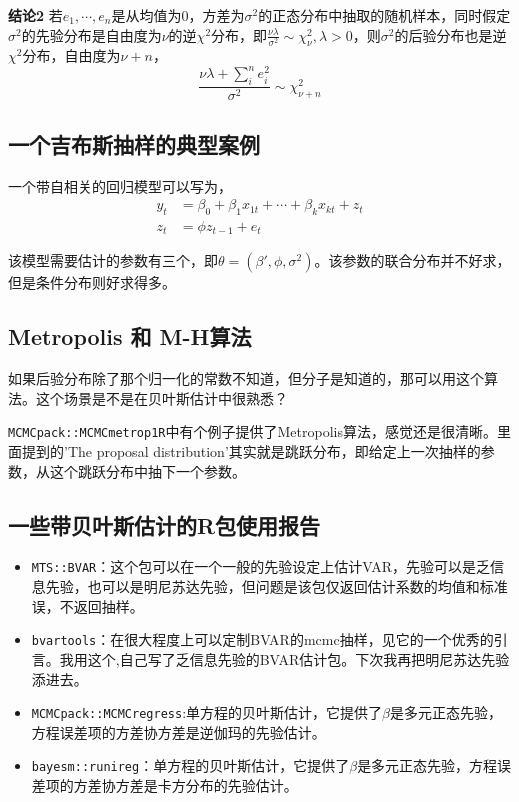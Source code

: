 \documentclass[
]{book}
\providecommand{\tightlist}{%
  \setlength{\itemsep}{0pt}\setlength{\parskip}{0pt}}
\begin{document}
\textbf{结论2} 若\(e_1,\cdots,e_n\)是从均值为0，方差为\(\sigma^2\)的正态分布中抽取的随机样本，同时假定\(\sigma^2\)的先验分布是自由度为\(\nu\)的逆\(\chi^2\)分布，即\(\frac{\nu\lambda}{\sigma^2}\sim \chi^2_\nu,\lambda>0\)，则\(\sigma^2\)的后验分布也是逆\(\chi^2\)分布，自由度为\(\nu+n\)，
\[\frac{\nu\lambda+\sum_i^ne_i^2}{\sigma^2}\sim \chi^2_{\nu+n}\]

\hypertarget{ux4e00ux4e2aux5409ux5e03ux65afux62bdux6837ux7684ux5178ux578bux6848ux4f8b}{%
\subsection{一个吉布斯抽样的典型案例}\label{ux4e00ux4e2aux5409ux5e03ux65afux62bdux6837ux7684ux5178ux578bux6848ux4f8b}}

一个带自相关的回归模型可以写为，
\begin{align}
y_t&=\beta_0+\beta_1x_{1t}+\cdots+\beta_kx_{kt}+z_t\\
z_t&=\phi z_{t-1}+e_t
\end{align}

该模型需要估计的参数有三个，即\(\theta = (\beta',\phi,\sigma^2)\)。该参数的联合分布并不好求，但是条件分布则好求得多。

\hypertarget{metropolis-ux548c-m-hux7b97ux6cd5}{%
\subsection{Metropolis 和 M-H算法}\label{metropolis-ux548c-m-hux7b97ux6cd5}}

如果后验分布除了那个归一化的常数不知道，但分子是知道的，那可以用这个算法。这个场景是不是在贝叶斯估计中很熟悉？

\texttt{MCMCpack::MCMCmetrop1R}中有个例子提供了Metropolis算法，感觉还是很清晰。里面提到的'The proposal distribution'其实就是跳跃分布，即给定上一次抽样的参数，从这个跳跃分布中抽下一个参数。

\hypertarget{ux4e00ux4e9bux5e26ux8d1dux53f6ux65afux4f30ux8ba1ux7684rux5305ux4f7fux7528ux62a5ux544a}{%
\subsection{一些带贝叶斯估计的R包使用报告}\label{ux4e00ux4e9bux5e26ux8d1dux53f6ux65afux4f30ux8ba1ux7684rux5305ux4f7fux7528ux62a5ux544a}}

\begin{itemize}
\tightlist
\item
  \texttt{MTS::BVAR}：这个包可以在一个一般的先验设定上估计VAR，先验可以是乏信息先验，也可以是明尼苏达先验，但问题是该包仅返回估计系数的均值和标准误，不返回抽样。
\item
  \texttt{bvartools}：在很大程度上可以定制BVAR的mcmc抽样，见它的一个优秀的引言。我用这个,自己写了乏信息先验的BVAR估计包。下次我再把明尼苏达先验添进去。
\item
  \texttt{MCMCpack::MCMCregress}:单方程的贝叶斯估计，它提供了\(\beta\)是多元正态先验，方程误差项的方差协方差是逆伽玛的先验估计。
\item
  \texttt{bayesm::runireg}：单方程的贝叶斯估计，它提供了\(\beta\)是多元正态先验，方程误差项的方差协方差是卡方分布的先验估计。
\end{itemize}
\end{document}
